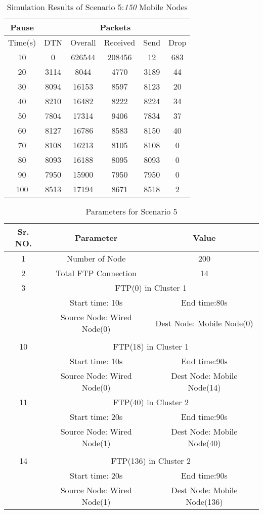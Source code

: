 \documentclass[3p,times]{elsarticle}
\begin{document}
\begin{table}[t]
\caption{Simulation Results of Scenario 5:\emph{150} Mobile Nodes}
\label{t12}
\centering
\begin{tabular}{|c|c|c|c|c|c|}
\hline
Pause  & \multicolumn{5}{c|}{Packets} \\
\hline
Time(s) & DTN   & Overall & Received & Send & Drop \\
\hline
10 & 0 & 626544 & 208456 & 12 & 683\\
20 & 3114 & 8044 & 4770 & 3189 & 44\\
30 & 8094 & 16153 & 8597 & 8123 & 20\\
40 & 8210 & 16482 & 8222 & 8224 & 34\\
50 & 7804 & 17314 & 9406 & 7834 & 37\\
60 & 8127 & 16786 & 8583 & 8150 & 40\\
70 & 8108 & 16213 & 8105 & 8108 & 0\\
80 & 8093 & 16188 & 8095 & 8093 & 0\\
90 & 7950 & 15900 & 7950 & 7950 & 0\\
100 & 8513 & 17194 & 8671 & 8518 & 2\\
\hline
\end{tabular}
\end{table}

\begin{table}[t]
\centering
\caption{Parameters for Scenario 5}
\begin{tabular}{|c|c|c|}
\hline
Sr. NO. & Parameter & Value \\
\hline
1 & Number of Node & 200 \\
2& Total FTP Connection & 14 \\
\hline
3 & \multicolumn{2}{|c|}{ FTP(0) in Cluster 1} \\
 & Start time: 10s &  End time:80s\\
 & Source Node: Wired Node(0) & Dest Node: Mobile Node(0) \\
 &  &  \\
\hline
10 & \multicolumn{2}{|c|}{ FTP(18) in Cluster 1} \\
 & Start time: 10s &  End time:90s\\
 & Source Node: Wired Node(0) & Dest Node: Mobile Node(14) \\
\hline
11 & \multicolumn{2}{|c|}{ FTP(40) in Cluster 2} \\
 & Start time: 20s &  End time:90s\\
 & Source Node: Wired Node(1) & Dest Node: Mobile Node(40) \\
\hline
 &  &  \\
\hline
14 & \multicolumn{2}{|c|}{ FTP(136) in Cluster 2} \\
 & Start time: 20s &  End time:90s\\
 & Source Node: Wired Node(1) & Dest Node: Mobile Node(136) \\
\hline
\end{tabular}
\label{t11}
\end{table}
\end{document}
